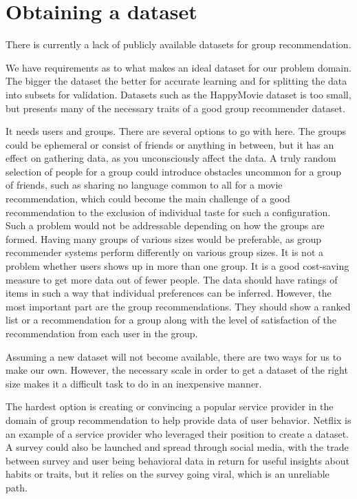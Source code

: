 \section{Obtaining a dataset}
There is currently a lack of publicly available datasets for group recommendation.

We have requirements as to what makes an ideal dataset for our problem domain. The bigger the dataset the better for accurate learning and for splitting the data into subsets for validation. Datasets such as the HappyMovie dataset is too small, but presents many of the necessary traits of a good group recommender dataset.

It needs users and groups. There are several options to go with here. The groups could be ephemeral or consist of friends or anything in between, but it has an effect on gathering data, as you unconsciously affect the data. A truly random selection of people for a group could introduce obstacles uncommon for a group of friends, such as sharing no language common to all for a movie recommendation, which could become the main challenge of a good recommendation to the exclusion of individual taste for such a configuration. Such a problem would not be addressable depending on how the groups are formed. Having many groups of various sizes would be preferable, as group recommender systems perform differently on various group sizes. It is not a problem whether users shows up in more than one group. It is a good cost-saving measure to get more data out of fewer people. The data should have ratings of items in such a way that individual preferences can be inferred. However, the most important part are the group recommendations. They should show a ranked list or a recommendation for a group along with the level of satisfaction of the recommendation from each user in the group.

Assuming a new dataset will not become available, there are two ways for us to make our own. However, the necessary scale in order to get a dataset of the right size makes it a difficult task to do in an inexpensive manner.

The hardest option is creating or convincing a popular service provider in the domain of group recommendation to help provide data of user behavior. Netflix is an example of a service provider who leveraged their position to create a dataset. A survey could also be launched and spread through social media, with the trade between survey and user being behavioral data in return for useful insights about habits or traits, but it relies on the survey going viral, which is an unreliable path.


